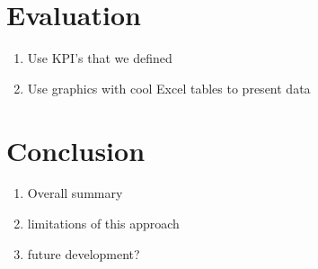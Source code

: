 \section{Evaluation}
\begin{enumerate}
	\item Use KPI's that we defined
	\item Use graphics with cool Excel tables to present data
\end{enumerate}

\section{Conclusion}
\begin{enumerate}
	\item Overall summary
	\item limitations of this approach
	\item future development?
\end{enumerate}

\cite{Winery}